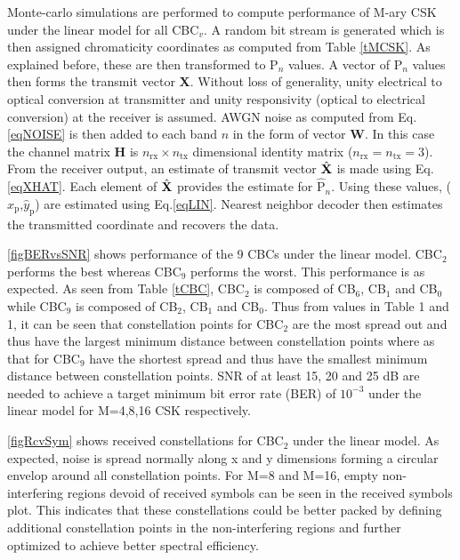 \documentclass[10pt,letterpaper]{article}
\newcommand{\vm}[1]{{\bf{#1}}}
\begin{document}
Monte-carlo simulations are performed to compute performance of M-ary CSK under the linear model for all CBC$_{v}$. A random bit stream is generated which is then assigned chromaticity coordinates as computed from Table \ref{tMCSK}. As explained before, these are then transformed to P$_{n}$ values. A vector of P$_{n}$ values then forms the transmit vector \vm{X}. {\color{red}Without loss of generality, unity electrical to optical conversion at transmitter and unity responsivity (optical to electrical conversion) at the receiver is assumed. AWGN noise as computed from Eq.\eqref{eqNOISE} is then added to each band $n$ in the form of vector \vm{W}. In this case the channel matrix \vm{H} is $n_{\text{rx}}\times n_{\text{tx}}$ dimensional identity matrix ($n_{\text{rx}}=n_{\text{tx}} = 3$).} From the receiver output, an estimate of transmit vector $\hat{\vm{X}}$ is made using Eq.\eqref{eqXHAT}. Each element of $\hat{\vm{X}}$ provides the estimate for $\hat{\text{P}}_{n}$. Using these values, ($\hat{x}_\text{p}$,$\hat{y}_\text{p}$) are estimated using Eq.\eqref{eqLIN}. Nearest neighbor decoder then estimates the transmitted coordinate and recovers the data.

\figurename\ref{figBERvsSNR} shows performance of the 9 CBCs under the linear model. CBC$_{2}$ performs the best whereas CBC$_{9}$ performs the worst. This performance is as expected. As seen from Table \ref{tCBC}, CBC$_{2}$ is composed of CB$_{6}$, CB$_{1}$ and CB$_{0}$ while CBC$_{9}$ is composed of CB$_{2}$, CB$_{1}$ and CB$_{0}$. Thus from values in Table 1 and \figurename 1, it can be seen that constellation points for CBC$_{2}$ are the most spread out and thus have the largest minimum distance between constellation points where as that for CBC$_{9}$ have the shortest spread and thus have the smallest minimum distance between constellation points. SNR of at least 15, 20 and 25 dB are needed to achieve a target minimum bit error rate (BER) of $10^{-3}$ under the linear model for M=4,8,16 CSK respectively.

\figurename\ref{figRcvSym} shows received constellations for CBC$_{2}$ under the linear model. As expected, noise is spread normally along x and y dimensions forming a circular envelop around all constellation points. {\color{red}For M=8 and M=16, empty non-interfering regions devoid of received symbols can be seen in the received symbols plot. This indicates that these constellations could be better packed by defining additional constellation points in the non-interfering regions and further optimized to achieve better spectral efficiency.} 
\end{document}
